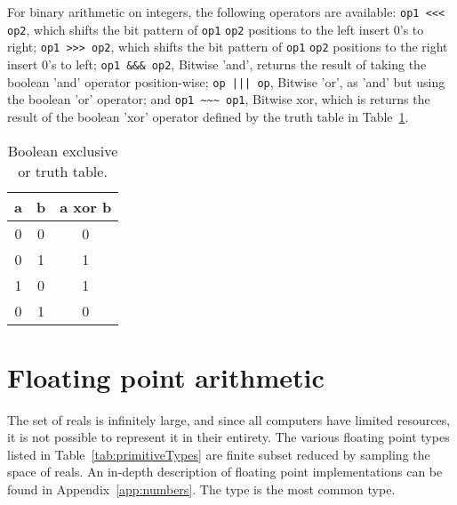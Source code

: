 
For binary arithmetic on integers, the following operators are available:
\lstinline{op1 <<< op2}, which shifts the bit pattern of \lstinline|op1| \lstinline|op2| positions to the left insert 0's to right;
\lstinline{op1 >>> op2}, which shifts the bit pattern of \lstinline|op1| \lstinline|op2| positions to the right insert 0's to left;
\lstinline{op1 &&& op2}, Bitwise 'and', returns the result of taking the boolean 'and' operator position-wise;
\lstinline{op ||| op}, Bitwise 'or', as 'and' but using the boolean 'or' operator; and
\lstinline{op1 ~~~ op1}, Bitwise xor, which is returns the result of the boolean 'xor' operator defined by the truth table in Table~\ref{tab:xor}.
\begin{table}
  \centering
  \begin{tabular}{|c|c|c|}
    \hline
    a&b& a xor b\\
    \hline
    0 & 0 & 0\\
    0 & 1 & 1\\
    1 & 0 & 1\\
    0 & 1 & 0\\
    \hline
  \end{tabular}
  \caption{Boolean exclusive or truth table.}
  \label{tab:xor}
\end{table}
%

\section{Floating point arithmetic}
The set of reals is infinitely large, and since all computers have limited resources, it is not possible to represent it in their entirety. The various floating point types listed in Table~\ref{tab:primitiveTypes} are finite subset reduced by sampling the space of reals. An in-depth description of floating point implementations can be found in Appendix~\ref{app:numbers}. The type  is the most common type. 


